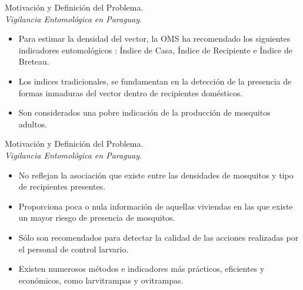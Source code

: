 
\begin{frame}[t]{Motivación y Definición del Problema.\\\textit{Vigilancia Entomológica en Paraguay.}}

    \begin{itemize}
      \item Para estimar la densidad del vector, la OMS ha recomendado los siguientes indicadores entomológicos : Índice de Casa, Índice de Recipiente e Índice de Breteau.

      \item  Los indices tradicionales, se fundamentan en la detección de la presencia de formas inmaduras del vector dentro de recipientes domésticos.

      \item Son considerados una pobre indicación de la producción de mosquitos adultos.

    \end{itemize}
\end{frame}


\begin{frame}[t]{Motivación y Definición del Problema.\\\textit{Vigilancia Entomológica en Paraguay.}}
    \begin{itemize}
      \item No reflejan la asociación que existe entre las densidades de mosquitos y tipo de recipientes presentes.

      \item Proporciona poca o nula información de aquellas viviendas en las que existe un mayor riesgo de presencia de mosquitos.

      \item Sólo son recomendados para detectar la calidad de las acciones realizadas por el personal de control larvario.

      \item Existen numerosos métodos e indicadores más prácticos, eficientes y económicos, como larvitrampas y ovitrampas.

    \end{itemize}
\end{frame}


